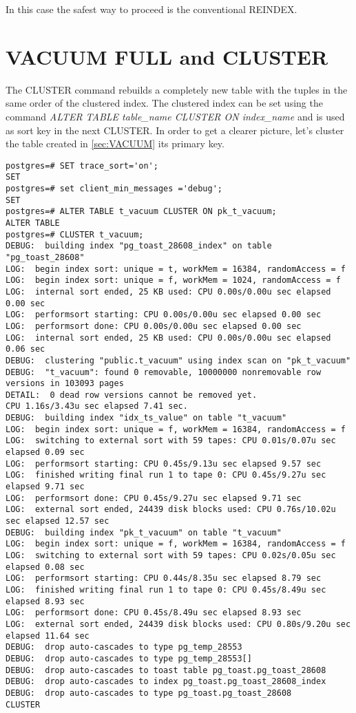 In this case the safest way to proceed is the conventional REINDEX. 

\begin{comment}


\end{comment}


\section{VACUUM FULL and CLUSTER}
The CLUSTER command rebuilds a completely new table with the tuples in the same order of the 
clustered index. The clustered index can be set using the command \textit{ALTER TABLE table\_name 
CLUSTER ON index\_name} and is used as sort key in the next CLUSTER. 
In order to get a clearer picture, let's cluster the table created in \ref{sec:VACUUM} its
primary key. 

\begin{lstlisting}[style=pgsql]
postgres=# SET trace_sort='on';
SET
postgres=# set client_min_messages ='debug';
SET
postgres=# ALTER TABLE t_vacuum CLUSTER ON pk_t_vacuum;
ALTER TABLE
postgres=# CLUSTER t_vacuum;
DEBUG:  building index "pg_toast_28608_index" on table "pg_toast_28608"
LOG:  begin index sort: unique = t, workMem = 16384, randomAccess = f
LOG:  begin index sort: unique = f, workMem = 1024, randomAccess = f
LOG:  internal sort ended, 25 KB used: CPU 0.00s/0.00u sec elapsed 0.00 sec
LOG:  performsort starting: CPU 0.00s/0.00u sec elapsed 0.00 sec
LOG:  performsort done: CPU 0.00s/0.00u sec elapsed 0.00 sec
LOG:  internal sort ended, 25 KB used: CPU 0.00s/0.00u sec elapsed 0.06 sec
DEBUG:  clustering "public.t_vacuum" using index scan on "pk_t_vacuum"
DEBUG:  "t_vacuum": found 0 removable, 10000000 nonremovable row versions in 103093 pages
DETAIL:  0 dead row versions cannot be removed yet.
CPU 1.16s/3.43u sec elapsed 7.41 sec.
DEBUG:  building index "idx_ts_value" on table "t_vacuum"
LOG:  begin index sort: unique = f, workMem = 16384, randomAccess = f
LOG:  switching to external sort with 59 tapes: CPU 0.01s/0.07u sec elapsed 0.09 sec
LOG:  performsort starting: CPU 0.45s/9.13u sec elapsed 9.57 sec
LOG:  finished writing final run 1 to tape 0: CPU 0.45s/9.27u sec elapsed 9.71 sec
LOG:  performsort done: CPU 0.45s/9.27u sec elapsed 9.71 sec
LOG:  external sort ended, 24439 disk blocks used: CPU 0.76s/10.02u sec elapsed 12.57 sec
DEBUG:  building index "pk_t_vacuum" on table "t_vacuum"
LOG:  begin index sort: unique = f, workMem = 16384, randomAccess = f
LOG:  switching to external sort with 59 tapes: CPU 0.02s/0.05u sec elapsed 0.08 sec
LOG:  performsort starting: CPU 0.44s/8.35u sec elapsed 8.79 sec
LOG:  finished writing final run 1 to tape 0: CPU 0.45s/8.49u sec elapsed 8.93 sec
LOG:  performsort done: CPU 0.45s/8.49u sec elapsed 8.93 sec
LOG:  external sort ended, 24439 disk blocks used: CPU 0.80s/9.20u sec elapsed 11.64 sec
DEBUG:  drop auto-cascades to type pg_temp_28553
DEBUG:  drop auto-cascades to type pg_temp_28553[]
DEBUG:  drop auto-cascades to toast table pg_toast.pg_toast_28608
DEBUG:  drop auto-cascades to index pg_toast.pg_toast_28608_index
DEBUG:  drop auto-cascades to type pg_toast.pg_toast_28608
CLUSTER

\end{lstlisting}

